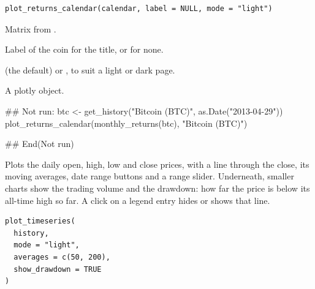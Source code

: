 \documentclass[a4paper]{book}
\begin{document}
%
\begin{Usage}
\begin{verbatim}
plot_returns_calendar(calendar, label = NULL, mode = "light")
\end{verbatim}
\end{Usage}
%
\begin{Arguments}
\begin{ldescription}
\item[\code{calendar}] Matrix from .

\item[\code{label}] Label of the coin for the title, or  for none.

\item[\code{mode}]  (the default) or , to suit a light or dark
page.
\end{ldescription}
\end{Arguments}
%
\begin{Value}
A plotly object.
\end{Value}
%
\begin{Examples}
\begin{ExampleCode}
## Not run: 
btc <- get_history("Bitcoin (BTC)", as.Date("2013-04-29"))
plot_returns_calendar(monthly_returns(btc), "Bitcoin (BTC)")

## End(Not run)
\end{ExampleCode}
\end{Examples}
%
\begin{Description}
Plots the daily open, high, low and close prices, with a line through the
close, its moving averages, date range buttons and a range slider.
Underneath, smaller charts show the trading volume and the drawdown: how
far the price is below its all-time high so far. A click on a legend entry
hides or shows that line.
\end{Description}
%
\begin{Usage}
\begin{verbatim}
plot_timeseries(
  history,
  mode = "light",
  averages = c(50, 200),
  show_drawdown = TRUE
)
\end{verbatim}
\end{Usage}
%
\end{document}
